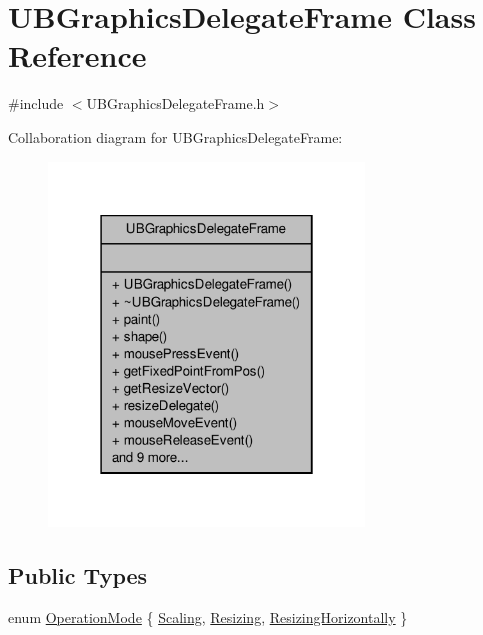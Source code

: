 \hypertarget{class_u_b_graphics_delegate_frame}{\section{U\-B\-Graphics\-Delegate\-Frame Class Reference}
\label{d5/ded/class_u_b_graphics_delegate_frame}
}


{\ttfamily \#include $<$U\-B\-Graphics\-Delegate\-Frame.\-h$>$}



Collaboration diagram for U\-B\-Graphics\-Delegate\-Frame\-:
\nopagebreak
\begin{figure}[H]
\begin{center}
\leavevmode
\includegraphics[width=238pt]{d3/d5c/class_u_b_graphics_delegate_frame__coll__graph}
\end{center}
\end{figure}
\subsection*{Public Types}
\begin{DoxyCompactItemize}
\item 
enum \hyperlink{class_u_b_graphics_delegate_frame_aa3195d439757dd154944daea507f5b94}{Operation\-Mode} \{ \hyperlink{class_u_b_graphics_delegate_frame_aa3195d439757dd154944daea507f5b94aa2b91fa8ff5510f3dd719d0a4f3b2e3f}{Scaling}, 
\hyperlink{class_u_b_graphics_delegate_frame_aa3195d439757dd154944daea507f5b94a7843dd7157918b91e2499ed85cd013d5}{Resizing}, 
\hyperlink{class_u_b_graphics_delegate_frame_aa3195d439757dd154944daea507f5b94aaa8eb433501e3e0ab2637ad2453ddbbc}{Resizing\-Horizontally}
 \}
\end{DoxyCompactItemize}
